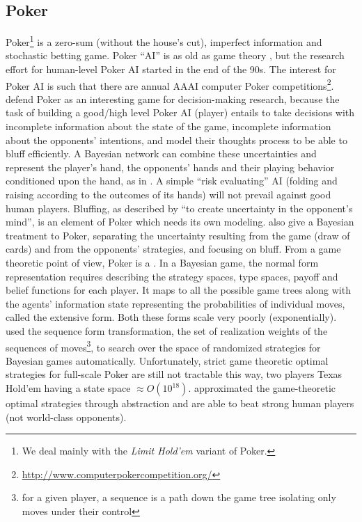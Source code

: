 \subsection{Poker}
Poker\footnote{We deal mainly with the \textit{Limit Hold'em} variant of Poker.} is a zero-sum (without the house's cut), imperfect information and stochastic betting game. Poker ``AI'' is as old as game theory \citep{nash51a}, but the research effort for human-level Poker AI started in the end of the 90s. The interest for Poker AI is such that there are annual AAAI computer Poker competitions\footnote{\url{http://www.computerpokercompetition.org/}}. \citet{Billings98pokeras} defend Poker as an interesting game for decision-making research, %
because the task of building a good/high level Poker AI (player) entails to take decisions with incomplete information about the state of the game, incomplete information about the opponents' intentions, and model their thoughts process to be able to bluff efficiently. A Bayesian network can combine these uncertainties and represent the player's hand, the opponents' hands and their playing behavior conditioned upon the hand, as in \citep{Korb99bayesianpoker}. A simple ``risk evaluating'' AI (folding and raising according to the outcomes of its hands) will not prevail against good human players. Bluffing, as described by \citet{VonNeumannMorgenstern1944} ``to create uncertainty in the opponent's mind'', is an element of Poker which needs its own modeling. \citet{Southey05bayesbluff} also give a Bayesian treatment to Poker, separating the uncertainty resulting from the game (draw of cards) and from the opponents' strategies, and focusing on bluff. From a game theoretic point of view, Poker is a . In a Bayesian game, the normal form representation requires describing the strategy spaces, type spaces, payoff and belief functions for each player. It maps to all the possible game trees along with the agents' information state representing the probabilities of individual moves, called the extensive form. Both these forms scale very poorly (exponentially). \citet{Koller97representationsand} used the sequence form transformation, the set of realization weights of the sequences of moves\footnote{for a given player, a sequence is a path down the game tree isolating only moves under their control}, %
to search over the space of randomized strategies for Bayesian games automatically. Unfortunately, strict game theoretic optimal strategies for full-scale Poker are still not tractable this way, two players Texas Hold'em having a state space $\approx O(10^{18})$. \citet{BillingsBDHSSS03} approximated the game-theoretic optimal strategies through abstraction and are able to beat strong human players (not world-class opponents).

